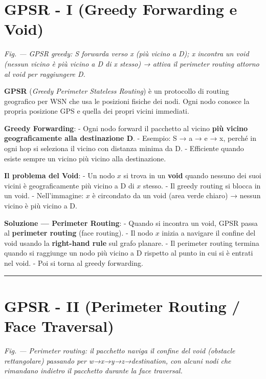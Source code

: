 \documentclass[
  italian,
  openany]{book}
\begin{document}
\section{GPSR - I (Greedy Forwarding e
Void)}\label{gpsr---i-greedy-forwarding-e-void}

\emph{Fig. --- GPSR greedy: S forwarda verso x (più vicino a D); x
incontra un void (nessun vicino è più vicino a D di x stesso) → attiva
il perimeter routing attorno al void per raggiungere D.}

\textbf{GPSR} (\emph{Greedy Perimeter Stateless Routing}) è un
protocollo di routing geografico per WSN che usa le posizioni fisiche
dei nodi. Ogni nodo conosce la propria posizione GPS e quella dei propri
vicini immediati.

\textbf{Greedy Forwarding}: - Ogni nodo forward il pacchetto al vicino
\textbf{più vicino geograficamente alla destinazione D}. - Esempio: S →
a → e → x, perché in ogni hop si seleziona il vicino con distanza minima
da D. - Efficiente quando esiste sempre un vicino più vicino alla
destinazione.

\textbf{Il problema del Void}: - Un nodo \(x\) si trova in un
\textbf{void} quando nessuno dei suoi vicini è geograficamente più
vicino a D di \(x\) stesso. - Il greedy routing si blocca in un void. -
Nell'immagine: \(x\) è circondato da un void (area verde chiaro) →
nessun vicino è più vicino a D.

\textbf{Soluzione --- Perimeter Routing}: - Quando si incontra un void,
GPSR passa al \textbf{perimeter routing} (face routing). - Il nodo \(x\)
inizia a navigare il confine del void usando la \textbf{right-hand rule}
sul grafo planare. - Il perimeter routing termina quando si raggiunge un
nodo più vicino a D rispetto al punto in cui si è entrati nel void. -
Poi si torna al greedy forwarding.

\begin{center}\rule{0.5\linewidth}{0.5pt}\end{center}

\section{GPSR - II (Perimeter Routing / Face
Traversal)}\label{gpsr---ii-perimeter-routing-face-traversal}

\emph{Fig. --- Perimeter routing: il pacchetto naviga il confine del
void (obstacle rettangolare) passando per w→x→y→z→destination, con
alcuni nodi che rimandano indietro il pacchetto durante la face
traversal.}
\end{document}
